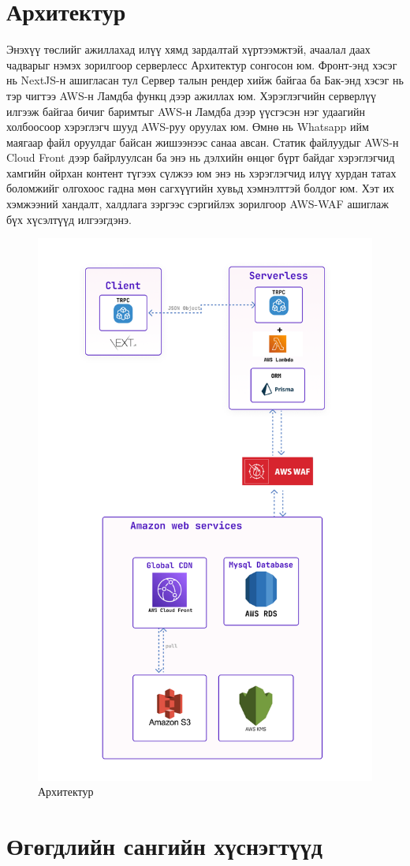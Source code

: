 \section{Архитектур}
Энэхүү төслийг ажиллахад илүү хямд зардалтай хүртээмжтэй, ачаалал даах чадварыг нэмэх зорилгоор серверлесс Архитектур сонгосон юм. Фронт-энд хэсэг нь NextJS-н ашигласан тул Сервер талын рендер хийж байгаа ба Бак-энд хэсэг нь тэр чигтээ AWS-н Ламдба функц дээр ажиллах юм. Хэрэглэгчийн серверлүү илгээж байгаа бичиг баримтыг AWS-н Ламдба дээр үүсгэсэн нэг удаагийн холбоосоор хэрэглэгч шууд AWS-руу оруулах юм. Өмнө нь Whatsapp ийм маягаар файл оруулдаг байсан жишээнээс санаа авсан. Статик файлуудыг AWS-н Cloud Front дээр байрлуулсан ба энэ нь дэлхийн өнцөг бүрт байдаг хэрэглэгчид хамгийн ойрхан контент түгээх сүлжээ юм энэ нь хэрэглэгчид илүү хурдан татах боломжийг олгохоос гадна мөн сагхүүгийн хувьд хэмнэлттэй болдог юм. Хэт их хэмжээний хандалт, халдлага зэргээс сэргийлэх зорилгоор AWS-WAF ашиглаж бүх хүсэлтүүд илгээгдэнэ.
\begin{figure}[h!]
	\centering
	\includegraphics[scale=0.32]{assets/server.png}
	\caption{Архитектур}
	\label{fig:architecture}
\end{figure}
\pagebreak
\newpage
\section[ӨС хүснэгтүүд]{Өгөгдлийн сангийн хүснэгтүүд}

\pagebreak
\newpage

